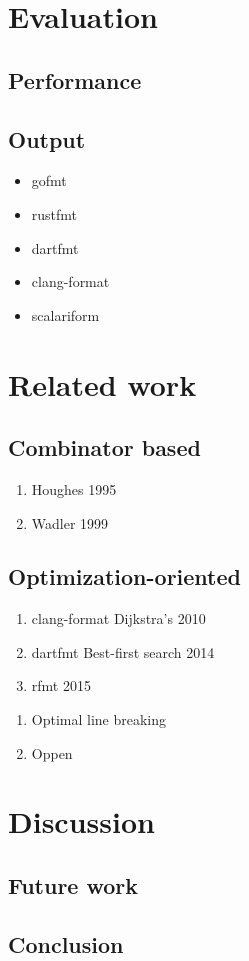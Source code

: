 \documentclass[11pt,a4paper]{article}
\begin{document}
\section{Evaluation}
\subsection{Performance} \subsection{Output}
\begin{itemize}
\item
 gofmt
\item
 rustfmt
\item
 dartfmt
\item
 clang-format
\item
 scalariform
\end{itemize}
\section{Related work}
\subsection{Combinator based}
\begin{enumerate}
\item
 Houghes 1995
\item
 Wadler 1999
\end{enumerate}
\subsection{Optimization-oriented}
\begin{enumerate}
\item
 clang-format Dijkstra's 2010
\item
 dartfmt Best-first search 2014
\item
 rfmt 2015
\end{enumerate}
\begin{enumerate}
\item
 Optimal line breaking
\item
 Oppen
\end{enumerate}
\section{Discussion}
\subsection{Future work} \subsection{Conclusion} \printbibliography{}
\end{document}
